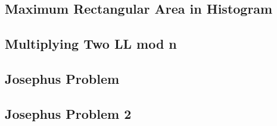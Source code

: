\subsection{Maximum Rectangular Area in Histogram}
\raggedbottom
\hrulefill
\subsection{Multiplying Two LL mod n}
\raggedbottom
\hrulefill
\subsection{Josephus Problem}
\raggedbottom
\hrulefill
\subsection{Josephus Problem 2}
\raggedbottom
\hrulefill

